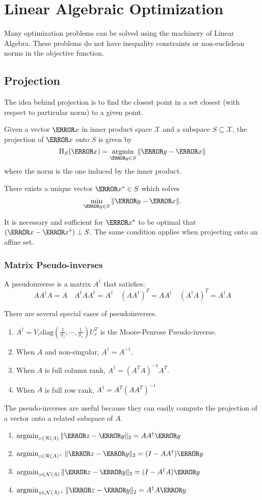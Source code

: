 \section{Linear Algebraic Optimization}
Many optimization problems can be solved using the machinery of Linear Algebra.
These problems do not have inequality constraints or non-euclidean norms in the objective function.
\subsection{Projection}
The idea behind projection is to find the closest point in a set closest (with respect to particular norm) to a given point.
\begin{definition}
  Given a vector $\V{x}$ in inner product space $\mathcal{X}$ and a subspace $S\subseteq\mathcal{X}$, the projection of $\V{x}$ onto $S$ is given by
  \[
	\Pi_S(\V{x}) = \argmin_{\V{y}\in S}\|\V{y}-\V{x}\|
  \]
  where the norm is the one induced by the inner product.
  \label{defn:projection}
\end{definition}
\begin{theorem}
  There exists a unique vector $\V{x}^*\in S$ which solves
  \[
	\min_{\V{y}\in S} \|\V{y}-\V{x}\|.
  \]
  \label{thm:projection}
\end{theorem} It is necessary and sufficient for $\V{x}^*$ to be optimal that $(\V{x}-\V{x}^*)\perp S$.
The same condition applies when projecting onto an affine set.
\subsubsection{Matrix Pseudo-inverses}
\begin{definition}
	A pseudoinverse is a matrix $A^{\dagger}$ that satisfies:
	\[
		A A^\dagger A = A \quad A^\dagger A A^\dagger = A^\dagger \quad (AA^\dagger)^T = A A^\dagger \quad (A^\dagger A)^T = A^\dagger A
	\]
	\label{defn:pseduoinverse}
\end{definition}
There are several special cases of pseudoinverses.
\begin{enumerate}
	\item $A^\dagger = V_r \text{diag}\left(\frac{1}{\sigma_1},\cdots,\frac{1}{\sigma_r}\right)U_r^T$ is the Moore-Penrose Pseudo-inverse.
	\item When $A$ and non-singular, $A^\dagger = A^{-1}$.
	\item When $A$ is full column rank, $A^\dagger = (A^TA)^{-1}A^T$.
	\item When $A$ is full row rank, $A^{\dagger} = A^T(AA^T)^{-1}$
\end{enumerate}
The pseudo-inverses are useful because they can easily compute the projection of a vector onto a related subspace of $A$.
\begin{enumerate}
	\item $\argmin_{z\in\mathcal{R}(A)}\|\V{z}-\V{y}\|_2 = AA^\dagger \V{y}$
	\item $\argmin_{z\in\mathcal{R}(A)^\perp}\|\V{z}-\V{y}\|_2 = (I - AA^\dagger)\V{y}$
	\item $\argmin_{z\in\mathcal{N}(A)}\|\V{z}-\V{y}\|_2 = (I - A^\dagger A)\V{y}$
	\item $\argmin_{z\in\mathcal{N}(A)^\perp}\|\V{z}-\V{y}\|_2 = A^\dagger A\V{y}$
\end{enumerate}
